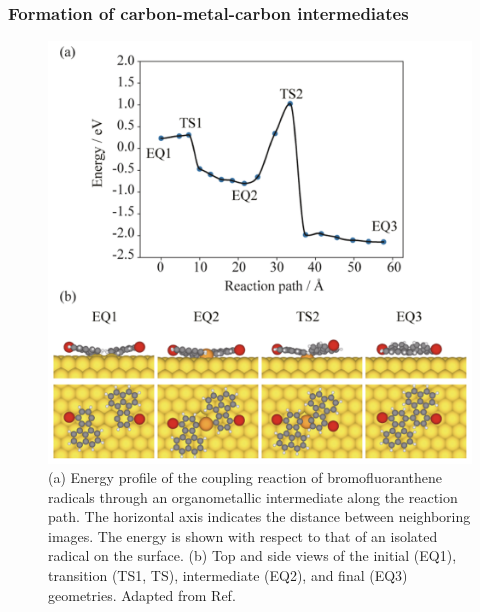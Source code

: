 \documentclass[%
 reprint,
 amsmath,amssymb,
 aps,
prb,
floatfix,
]{revtex4-2}
\begin{document}
\ifdefined\INTERNAL

\subsubsection{Formation of carbon-metal-carbon intermediates} \label{sec:dimerized-adatom}

\begin{figure}[tb]
\centering
\includegraphics[width=0.75\columnwidth]{Fig/adatominformation.png}
\caption{(a) Energy profile of the coupling reaction of bromofluoranthene radicals through an organometallic intermediate along the reaction path. The horizontal axis indicates the distance between neighboring images. The energy is shown with respect to that of an isolated radical on the surface. (b) Top and side views of the initial (EQ1), transition (TS1, TS), intermediate (EQ2), and final (EQ3) geometries. Adapted from Ref.~\cite{jpcc2018}}
\label{fig:high-lift}
\end{figure}
\end{document}
